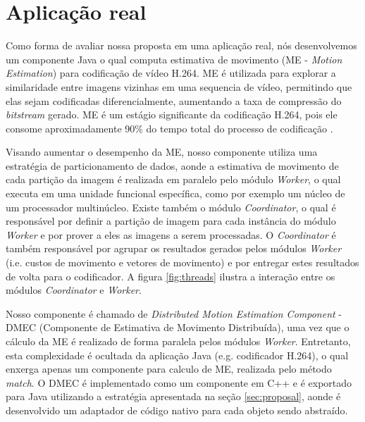 \section{Aplicação real}
\label{sec:case_study}
% 
% 
% 
% 
%
Como forma de avaliar nossa proposta em uma aplicação real, nós desenvolvemos
um componente Java o qual computa estimativa de movimento 
(ME - \emph{Motion Estimation}) para codificação de vídeo H.264.
ME é utilizada para explorar a similaridade entre imagens
vizinhas em uma sequencia de vídeo, permitindo que elas sejam codificadas 
diferencialmente, aumentando a taxa de compressão do 
\emph{bitstream} gerado. %
ME é um estágio significante da codificação H.264, pois ele consome 
aproximadamente 90\% do tempo total do processo de 
codificação \cite{XiangLi:2004}.

Visando aumentar o desempenho da ME, nosso componente utiliza uma estratégia de
particionamento de dados, aonde a estimativa de movimento de cada partição da
imagem é realizada em paralelo pelo módulo \emph{Worker}, o qual executa em
uma unidade funcional específica, como por exemplo um núcleo de um processador
multinúcleo.
Existe também o módulo \emph{Coordinator}, o qual é responsável por definir a
partição de imagem para cada instância do módulo \emph{Worker} e por prover a
eles as imagens a serem processadas.
O \emph{Coordinator} é também responsável por agrupar os resultados gerados pelos
módulos \emph{Worker} (i.e. custos de movimento e vetores de movimento) e por
entregar estes resultados de volta para o codificador. 
A figura \ref{fig:threads} ilustra a interação entre os módulos 
\emph{Coordinator} e \emph{Worker}.


Nosso componente é chamado de \emph{Distributed Motion Estimation Component} - 
DMEC (Componente de Estimativa de Movimento Distribuída), uma vez que o 
cálculo da ME é realizado de forma paralela pelos módulos \emph{Worker}.
Entretanto, esta complexidade é ocultada da aplicação Java 
(e.g. codificador H.264), o qual enxerga apenas um componente para calculo de ME,
realizada pelo método \emph{match}.
O DMEC é implementado como um componente em C++ e é exportado para Java utilizando
a estratégia apresentada na seção \ref{sec:proposal}, aonde é desenvolvido um 
adaptador de código nativo para cada objeto sendo abstraído.


